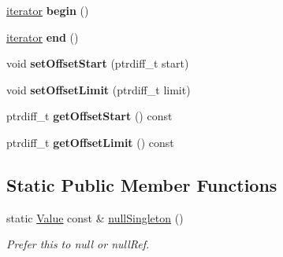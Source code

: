 \begin{DoxyCompactItemize}
\item 
\hyperlink{classJson_1_1ValueIterator}{iterator} {\bfseries begin} ()\hypertarget{classJson_1_1Value_a2d45bb2e68e8f22fe356d7d955ebd3c9}{}\label{classJson_1_1Value_a2d45bb2e68e8f22fe356d7d955ebd3c9}

\item 
\hyperlink{classJson_1_1ValueIterator}{iterator} {\bfseries end} ()\hypertarget{classJson_1_1Value_a2f961eff73f7f79cd29260b6cbd42558}{}\label{classJson_1_1Value_a2f961eff73f7f79cd29260b6cbd42558}

\item 
void {\bfseries set\+Offset\+Start} (ptrdiff\+\_\+t start)\hypertarget{classJson_1_1Value_a92e32ea0f4f8a15853a3cf0beac9feb9}{}\label{classJson_1_1Value_a92e32ea0f4f8a15853a3cf0beac9feb9}

\item 
void {\bfseries set\+Offset\+Limit} (ptrdiff\+\_\+t limit)\hypertarget{classJson_1_1Value_a5e4f5853fec138150c5df6004a8c2bcf}{}\label{classJson_1_1Value_a5e4f5853fec138150c5df6004a8c2bcf}

\item 
ptrdiff\+\_\+t {\bfseries get\+Offset\+Start} () const \hypertarget{classJson_1_1Value_a9db4cb1a48c3c0ff41332c259e8acf20}{}\label{classJson_1_1Value_a9db4cb1a48c3c0ff41332c259e8acf20}

\item 
ptrdiff\+\_\+t {\bfseries get\+Offset\+Limit} () const \hypertarget{classJson_1_1Value_a4f92b010664f61ec5eea8ca3f31b149b}{}\label{classJson_1_1Value_a4f92b010664f61ec5eea8ca3f31b149b}

\end{DoxyCompactItemize}
\subsection*{Static Public Member Functions}
\begin{DoxyCompactItemize}
\item 
static \hyperlink{classJson_1_1Value}{Value} const \& \hyperlink{classJson_1_1Value_a1c8d09e24220363c6f07c3af7ffa72b2}{null\+Singleton} ()\hypertarget{classJson_1_1Value_a1c8d09e24220363c6f07c3af7ffa72b2}{}\label{classJson_1_1Value_a1c8d09e24220363c6f07c3af7ffa72b2}

\begin{DoxyCompactList}\small\item\em Prefer this to null or null\+Ref. \end{DoxyCompactList}\end{DoxyCompactItemize}
